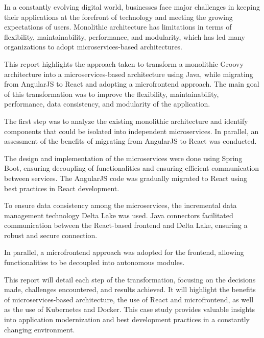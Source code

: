 \introduction

In a constantly evolving digital world, businesses face major challenges in keeping their applications at the forefront of technology and meeting the growing expectations of users. Monolithic architecture has limitations in terms of flexibility, maintainability, performance, and modularity, which has led many organizations to adopt microservices-based architectures.

\medskip

This report highlights the approach taken to transform a monolithic Groovy architecture into a microservices-based architecture using Java, while migrating from AngularJS to React and adopting a microfrontend approach. The main goal of this transformation was to improve the flexibility, maintainability, performance, data consistency, and modularity of the application.

\medskip

The first step was to analyze the existing monolithic architecture and identify components that could be isolated into independent microservices. In parallel, an assessment of the benefits of migrating from AngularJS to React was conducted.

\medskip

The design and implementation of the microservices were done using Spring Boot, ensuring decoupling of functionalities and ensuring efficient communication between services. The AngularJS code was gradually migrated to React using best practices in React development.

\medskip

To ensure data consistency among the microservices, the incremental data management technology Delta Lake was used. Java connectors facilitated communication between the React-based frontend and Delta Lake, ensuring a robust and secure connection.

\medskip

In parallel, a microfrontend approach was adopted for the frontend, allowing functionalities to be decoupled into autonomous modules.

\medskip

This report will detail each step of the transformation, focusing on the decisions made, challenges encountered, and results achieved. It will highlight the benefits of microservices-based architecture, the use of React and microfrontend, as well as the use of Kubernetes and Docker. This case study provides valuable insights into application modernization and best development practices in a constantly changing environment.